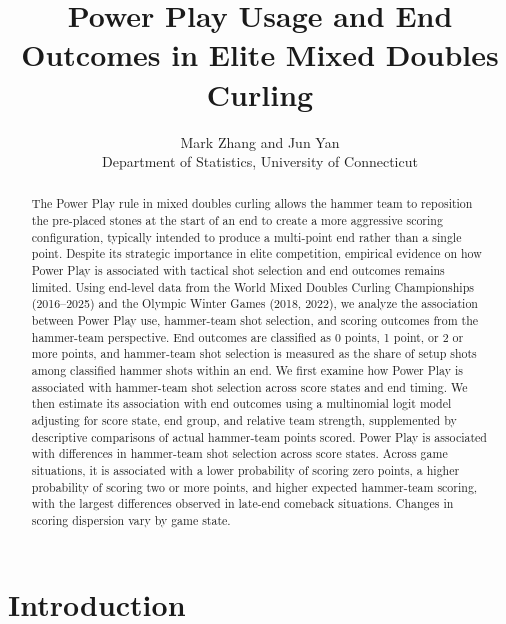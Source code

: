 \documentclass[titlepage, 12pt]{article}
\title{Power Play Usage and End Outcomes in Elite Mixed Doubles Curling}
\author{
Mark Zhang and Jun Yan \\
Department of Statistics, University of Connecticut
}
\begin{document}
\maketitle

\begin{abstract}
        The Power Play rule in mixed doubles curling allows the hammer team to
        reposition the pre-placed stones at the start of an end to create a more
        aggressive scoring configuration, typically intended to produce a multi-point
        end rather than a single point. Despite its strategic importance in elite
        competition, empirical evidence on how Power Play is associated with tactical
        shot selection and end outcomes remains limited. Using end-level data from the
        World Mixed Doubles Curling Championships (2016–2025) and the Olympic Winter
        Games (2018, 2022), we analyze the association between Power Play use,
        hammer-team shot selection, and scoring outcomes from the hammer-team
        perspective. End outcomes are classified as 0 points, 1 point, or 2 or more
        points, and hammer-team shot selection is measured as the share of setup shots
        among classified hammer shots within an end. We first examine how Power Play is
        associated with hammer-team shot selection across score states and end timing.
        We then estimate its association with end outcomes using a multinomial logit
        model adjusting for score state, end group, and relative team strength,
        supplemented by descriptive comparisons of actual hammer-team points scored.
        Power Play is associated with differences in hammer-team shot selection across
        score states. Across game situations, it is associated with a lower probability
        of scoring zero points, a higher probability of scoring two or more points, and
        higher expected hammer-team scoring, with the largest differences observed in
        late-end comeback situations. Changes in scoring dispersion vary by game state.
\end{abstract}

\doublespacing

\section{Introduction}\label{sec:intro}
\end{document}
